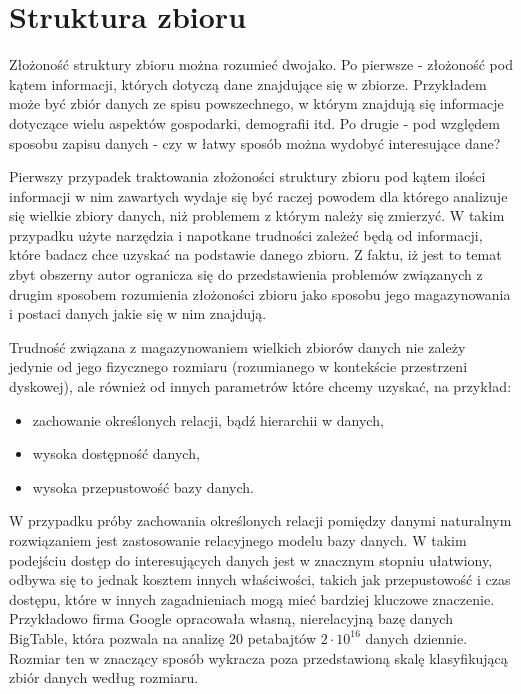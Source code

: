 \documentclass[man,mfu]{mgrwms}
\begin{document}
\section{Struktura zbioru}

Złożoność struktury zbioru można rozumieć dwojako. Po pierwsze - złożoność pod kątem informacji, których dotyczą dane znajdujące się w zbiorze. Przykładem może być zbiór danych ze spisu powszechnego, w którym znajdują się informacje dotyczące wielu aspektów gospodarki, demografii itd. Po drugie - pod względem sposobu zapisu danych - czy w łatwy sposób można wydobyć interesujące dane? 

Pierwszy przypadek traktowania złożoności struktury zbioru pod kątem ilości informacji w nim zawartych wydaje się być raczej powodem dla którego analizuje się wielkie zbiory danych, niż problemem z którym należy się zmierzyć. W takim przypadku użyte narzędzia i napotkane trudności zależeć będą od informacji, które badacz chce uzyskać na podstawie danego zbioru. Z faktu, iż jest to temat zbyt obszerny autor ogranicza się do przedstawienia problemów związanych z drugim sposobem rozumienia złożoności zbioru jako sposobu jego magazynowania i postaci danych jakie się w nim znajdują.

Trudność związana z magazynowaniem wielkich zbiorów danych nie zależy jedynie od jego fizycznego rozmiaru (rozumianego w kontekście przestrzeni dyskowej), ale również od innych parametrów które chcemy uzyskać, na przykład:
\begin{itemize}
\item zachowanie określonych relacji, bądź hierarchii w danych,
\item wysoka dostępność danych,
\item wysoka przepustowość bazy danych.
\end{itemize}

W przypadku próby zachowania określonych relacji pomiędzy danymi naturalnym rozwiązaniem jest zastosowanie relacyjnego modelu bazy danych. W takim podejściu dostęp do interesujących danych jest w znacznym stopniu ułatwiony, odbywa się to jednak kosztem innych właściwości, takich jak przepustowość i czas dostępu, które w innych zagadnieniach mogą mieć bardziej kluczowe znaczenie. Przykładowo firma  Google opracowała własną, nierelacyjną bazę danych BigTable\cite{bigtable}, która pozwala na analizę 20 petabajtów $2\cdot 10^{16}$ danych dziennie\cite{nosql}. Rozmiar ten w znaczący sposób wykracza poza przedstawioną skalę klasyfikującą zbiór danych według rozmiaru.
\end{document}
